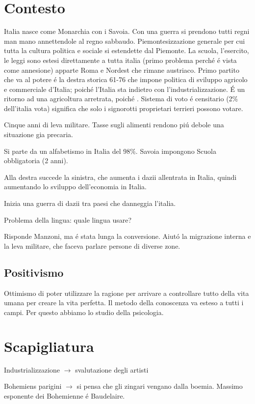 \documentclass{article}
\begin{document}
\section{Contesto}
Italia nasce come Monarchia con i Savoia. Con una guerra si prendono tutti regni man mano annettendole al regno sabbaudo. Piemontesizzazione generale per cui tutta la cultura politica e sociale si estendette dal Piemonte. La scuola, l'esercito, le leggi sono estesi direttamente a tutta italia (primo problema perché é vista come annesione) apparte Roma e Nordest che rimane austriaco. Primo partito che va al potere é la destra storica 61-76 che impone politica di sviluppo agricolo e commerciale d'Italia; poiché l'Italia sta indietro con l'industrializzazione. É un ritorno ad una agricoltura arretrata, poiché . Sistema di voto é censitario (2\% dell'italia vota) significa che solo i signorotti proprietari terrieri possono votare.
\begin{center}
Cinque anni di leva militare. Tasse sugli alimenti rendono piú debole una situazione gia precaria.

Si parte da un alfabetismo in Italia del 98\%. Savoia impongono Scuola obbligatoria (2 anni).
\end{center}
Alla destra succede la sinistra, che aumenta i dazii allentrata in Italia, quindi aumentando lo sviluppo dell'economia in Italia.

Inizia una guerra di dazii tra paesi che danneggia l'italia.
\begin{center}
Problema della lingua: quale lingua usare?

Risponde Manzoni, ma é stata lunga la conversione. Aiutó la migrazione interna e la leva militare, che faceva parlare persone di diverse zone.
\end{center}
\subsection{Positivismo}
Ottimismo di poter utilizzare la ragione per arrivare a controllare tutto della vita umana per creare la vita perfetta. Il metodo della conoscenza va esteso a tutti i campi. Per questo abbiamo lo studio della psicologia.
\section{Scapigliatura}
Industrializzazione $\to$ svalutazione degli artisti

Bohemiens parigini $\to$ si pensa che gli zingari vengano dalla boemia. Massimo esponente dei Bohemienne é Baudelaire.
\end{document}
